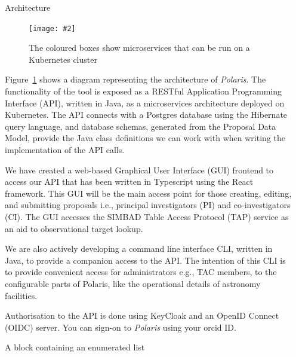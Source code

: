 \documentclass[final]{beamer}
\newlength{\sepwidth}
\newlength{\colwidth}
\newcommand{\separatorcolumn}{\begin{column}{\sepwidth}\end{column}}
\newcommand{\insertFigure}[3][width=1.0\textwidth]{%
    \begin{figure}[ht]
    \centering
    \texttt{[image: \#2]}
    \caption{#3}
    \label{fig:#2}
    \end{figure}
}
\begin{document}
\begin{frame}[t]
\begin{columns}[t]
            \separatorcolumn

            \begin{column}{\colwidth}

                \begin{block}{Architecture}

                    \insertFigure[width=12cm,height=15cm]{architecture}{The coloured boxes show microservices that can be run on a Kubernetes cluster}

                    Figure~\ref{fig:architecture} shows a diagram representing the architecture of \emph{Polaris}.
                    The functionality of the tool is exposed as a RESTful Application Programming Interface (API),
                    written in Java, as a microservices architecture deployed on Kubernetes.
                    The API connects with a Postgres database using the Hibernate query language, and database schemas,
                    generated from the Proposal Data Model, provide the Java class definitions we can work with when
                    writing the implementation of the API calls.

                    We have created a web-based Graphical User Interface (GUI) frontend to access our API that has been
                    written in Typescript using the React framework.
                    This GUI will be the main access point for those creating, editing, and submitting proposals i.e.,
                    principal investigators (PI) and co-investigators (CI).
                    The GUI accesses the SIMBAD Table Access Protocol (TAP) service as an aid to observational target
                    lookup.

                    We are also actively developing a command line interface CLI, written in Java, to provide a
                    companion access to the API. The intention of this CLI is to provide convenient access for
                    administrators e.g., TAC members, to the configurable parts of Polaris, like the operational
                    details of astronomy facilities.

                    Authorisation to the API is done using KeyCloak and an OpenID Connect (OIDC) server.
                    You can sign-on to \emph{Polaris} using your orcid ID\@.

                \end{block}

                \begin{block}{A block containing an enumerated list}


\end{block}
\end{column}
\end{columns}
\end{frame}
\end{document}
